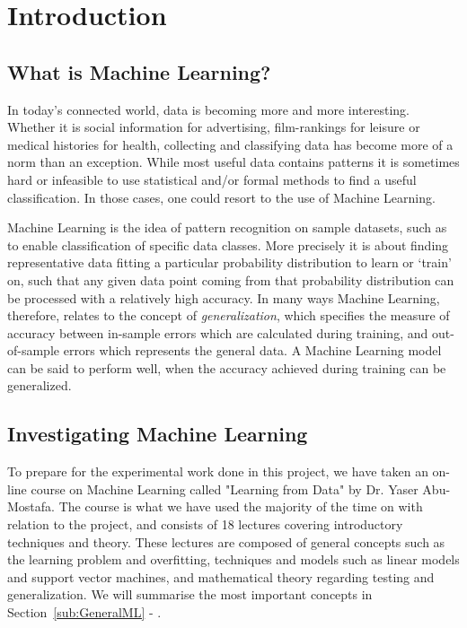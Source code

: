 \section{Introduction}
\label{sec:Introduction}
\subsection{What is Machine Learning?}
In today's connected world, data is becoming more and more interesting. 
Whether it is social information for advertising, film-rankings for leisure or medical histories for health, 
collecting and classifying data has become more of a norm than an exception.
While most useful data contains patterns it is sometimes hard or infeasible to use statistical and/or formal methods 
to find a useful classification. In those cases, one could resort to the use of Machine Learning.

Machine Learning is the idea of pattern recognition on sample datasets,
such as to enable classification of specific data classes.
More precisely it is about finding representative data fitting a particular probability distribution to learn or `train' on, 
such that any given data point coming from that probability distribution can be processed with a relatively high accuracy.
In many ways Machine Learning, therefore, relates to the concept of \emph{generalization}, which specifies 
the measure of accuracy between in-sample errors which are calculated during training, and out-of-sample errors which represents the general data.
A Machine Learning model can be said to perform well, when the accuracy achieved during training can be generalized.

\subsection{Investigating Machine Learning}
To prepare for the experimental work done in this project, we have taken an on-line course
on Machine Learning called "Learning from Data" by Dr. Yaser Abu-Mostafa\cite{learningfromdata2012course}.
The course is what we have used the majority of the time on with relation to the project, and consists
of 18 lectures covering introductory techniques and theory.
These lectures are composed of general concepts such as the learning problem and overfitting, 
techniques and models such as linear models and support vector machines, 
and mathematical theory regarding testing and generalization.
We will summarise the most important concepts in Section~\ref{sub:GeneralML} - .

